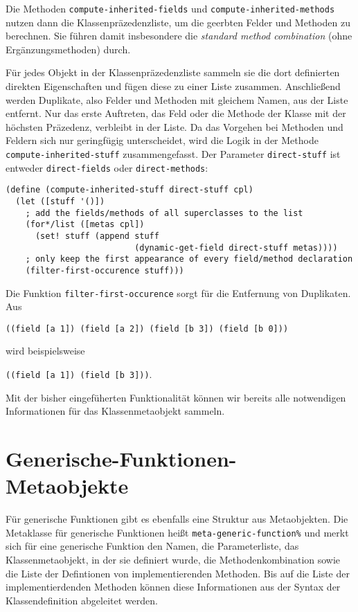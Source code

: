 Die Methoden \texttt{compute-inherited-fields} und \texttt{compute-inherited-methods} nutzen dann die Klassenpräzedenzliste, um die geerbten Felder und Methoden zu berechnen. Sie führen damit insbesondere die \textit{standard method combination} (ohne Ergänzungsmethoden) durch.

Für jedes Objekt in der Klassenpräzedenzliste sammeln sie die dort definierten direkten Eigenschaften und fügen diese zu einer Liste zusammen. Anschließend werden Duplikate, also Felder und Methoden mit gleichem Namen, aus der Liste entfernt. Nur das erste Auftreten, das Feld oder die Methode der Klasse mit der höchsten Präzedenz, verbleibt in der Liste. Da das Vorgehen bei Methoden und Feldern sich nur geringfügig unterscheidet, wird die Logik in der Methode \texttt{compute-inherited-stuff} zusammengefasst. Der Parameter \texttt{direct-stuff} ist entweder \texttt{{\textquotesingle}direct-fields} oder \texttt{{\textquotesingle}direct-methods}:

\begin{lstlisting}
(define (compute-inherited-stuff direct-stuff cpl)
  (let ([stuff '()])
    ; add the fields/methods of all superclasses to the list
    (for*/list ([metas cpl])
      (set! stuff (append stuff 
                          (dynamic-get-field direct-stuff metas))))
    ; only keep the first appearance of every field/method declaration
    (filter-first-occurence stuff)))
\end{lstlisting}

Die Funktion \texttt{filter-first-occurence} sorgt für die Entfernung von Duplikaten. Aus

\texttt{\textquotesingle((field [a 1]) (field [a 2]) (field [b 3]) (field [b 0]))}

wird beispielsweise

\texttt{\textquotesingle((field [a 1]) (field [b 3]))}.

Mit der bisher eingefüherten Funktionalität können wir bereits alle notwendigen Informationen für das Klassenmetaobjekt sammeln.

\section{Generische-Funktionen-Metaobjekte}
Für generische Funktionen gibt es ebenfalls eine Struktur aus Metaobjekten. Die Metaklasse für generische Funktionen heißt \texttt{meta-generic-function\%} und merkt sich für eine generische Funktion den Namen, die Parameterliste, das Klassenmetaobjekt, in der sie definiert wurde, die Methodenkombination sowie die Liste der Defintionen von implementierenden Methoden. Bis auf die Liste der implementierdenden Methoden können diese Informationen aus der Syntax der Klassendefinition abgeleitet werden.

